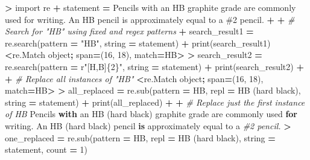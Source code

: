 \documentclass[
]{book}
\newenvironment{Shaded}{\begin{snugshade}}{\end{snugshade}}
\newcommand{\BuiltInTok}[1]{#1}
\newcommand{\CommentTok}[1]{\textcolor[rgb]{0.56,0.35,0.01}{\textit{#1}}}
\newcommand{\ControlFlowTok}[1]{\textcolor[rgb]{0.13,0.29,0.53}{\textbf{#1}}}
\newcommand{\DecValTok}[1]{\textcolor[rgb]{0.00,0.00,0.81}{#1}}
\newcommand{\ImportTok}[1]{#1}
\newcommand{\KeywordTok}[1]{\textcolor[rgb]{0.13,0.29,0.53}{\textbf{#1}}}
\newcommand{\NormalTok}[1]{#1}
\newcommand{\OperatorTok}[1]{\textcolor[rgb]{0.81,0.36,0.00}{\textbf{#1}}}
\newcommand{\SpecialCharTok}[1]{\textcolor[rgb]{0.00,0.00,0.00}{#1}}
\newcommand{\StringTok}[1]{\textcolor[rgb]{0.31,0.60,0.02}{#1}}
\newcommand{\VerbatimStringTok}[1]{\textcolor[rgb]{0.31,0.60,0.02}{#1}}
\begin{document}
\begin{Shaded}
\begin{Highlighting}[]
\OperatorTok{\textgreater{}} \ImportTok{import}\NormalTok{ re}
\OperatorTok{+}\NormalTok{ statement }\OperatorTok{=} \StringTok{\textquotesingle{}Pencils with an HB graphite grade are commonly used for writing. An HB pencil is approximately equal to a \#2 pencil.\textquotesingle{}}
\OperatorTok{+} 
\OperatorTok{+} \CommentTok{\# Search for "HB" using fixed and regex patterns}
\OperatorTok{+}\NormalTok{ search\_result1 }\OperatorTok{=}\NormalTok{ re.search(pattern }\OperatorTok{=} \StringTok{"HB"}\NormalTok{, string }\OperatorTok{=}\NormalTok{ statement)}
\OperatorTok{+} \BuiltInTok{print}\NormalTok{(search\_result1)}
\OperatorTok{\textless{}}\NormalTok{re.Match }\BuiltInTok{object}\OperatorTok{;}\NormalTok{ span}\OperatorTok{=}\NormalTok{(}\DecValTok{16}\NormalTok{, }\DecValTok{18}\NormalTok{), match}\OperatorTok{=}\StringTok{\textquotesingle{}HB\textquotesingle{}}\OperatorTok{\textgreater{}}
\OperatorTok{\textgreater{}}\NormalTok{ search\_result2 }\OperatorTok{=}\NormalTok{ re.search(pattern }\OperatorTok{=} \VerbatimStringTok{r"[H,B]}\SpecialCharTok{\{2\}}\VerbatimStringTok{"}\NormalTok{, string }\OperatorTok{=}\NormalTok{ statement)}
\OperatorTok{+} \BuiltInTok{print}\NormalTok{(search\_result2)}
\OperatorTok{+} 
\OperatorTok{+} \CommentTok{\# Replace all instances of "HB"}
\OperatorTok{\textless{}}\NormalTok{re.Match }\BuiltInTok{object}\OperatorTok{;}\NormalTok{ span}\OperatorTok{=}\NormalTok{(}\DecValTok{16}\NormalTok{, }\DecValTok{18}\NormalTok{), match}\OperatorTok{=}\StringTok{\textquotesingle{}HB\textquotesingle{}}\OperatorTok{\textgreater{}}
\OperatorTok{\textgreater{}}\NormalTok{ all\_replaced }\OperatorTok{=}\NormalTok{ re.sub(pattern }\OperatorTok{=} \StringTok{\textquotesingle{}HB\textquotesingle{}}\NormalTok{, repl }\OperatorTok{=} \StringTok{\textquotesingle{}HB (hard black)\textquotesingle{}}\NormalTok{, string }\OperatorTok{=}\NormalTok{ statement)}
\OperatorTok{+} \BuiltInTok{print}\NormalTok{(all\_replaced)}
\OperatorTok{+} 
\OperatorTok{+} \CommentTok{\# Replace just the first instance of HB}
\NormalTok{Pencils }\ControlFlowTok{with}\NormalTok{ an HB (hard black) graphite grade are commonly used }\ControlFlowTok{for}\NormalTok{ writing. An HB (hard black) pencil }\KeywordTok{is}\NormalTok{ approximately equal to a }\CommentTok{\#2 pencil.}
\OperatorTok{\textgreater{}}\NormalTok{ one\_replaced }\OperatorTok{=}\NormalTok{ re.sub(pattern }\OperatorTok{=} \StringTok{\textquotesingle{}HB\textquotesingle{}}\NormalTok{, repl }\OperatorTok{=} \StringTok{\textquotesingle{}HB (hard black)\textquotesingle{}}\NormalTok{, string }\OperatorTok{=}\NormalTok{ statement, count }\OperatorTok{=} \DecValTok{1}\NormalTok{)}

\end{Highlighting}
\end{Shaded}
\end{document}
